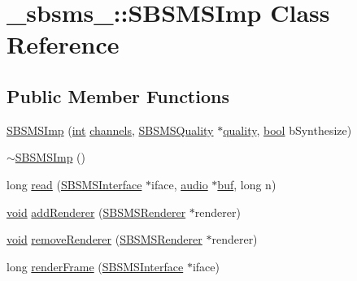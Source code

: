 \hypertarget{class__sbsms___1_1_s_b_s_m_s_imp}{}\section{\+\_\+sbsms\+\_\+\+:\+:S\+B\+S\+M\+S\+Imp Class Reference}
\label{class__sbsms___1_1_s_b_s_m_s_imp}
\subsection*{Public Member Functions}
\begin{DoxyCompactItemize}
\item 
\hyperlink{class__sbsms___1_1_s_b_s_m_s_imp_aae19cb82d09b4891efd2502de71b8eba}{S\+B\+S\+M\+S\+Imp} (\hyperlink{xmltok_8h_a5a0d4a5641ce434f1d23533f2b2e6653}{int} \hyperlink{class__sbsms___1_1_s_b_s_m_s_imp_abd260927c70ac1e41c4b37b3445eae69}{channels}, \hyperlink{class__sbsms___1_1_s_b_s_m_s_quality}{S\+B\+S\+M\+S\+Quality} $\ast$\hyperlink{class__sbsms___1_1_s_b_s_m_s_imp_ad1b294ed77e52813409d048751af118c}{quality}, \hyperlink{mac_2config_2i386_2lib-src_2libsoxr_2soxr-config_8h_abb452686968e48b67397da5f97445f5b}{bool} b\+Synthesize)
\item 
\hyperlink{class__sbsms___1_1_s_b_s_m_s_imp_a76d6ef5a5db4686c10cffa55989deffe}{$\sim$\+S\+B\+S\+M\+S\+Imp} ()
\item 
long \hyperlink{class__sbsms___1_1_s_b_s_m_s_imp_ad7942364e8753c9a93e186d36d7edec8}{read} (\hyperlink{class__sbsms___1_1_s_b_s_m_s_interface}{S\+B\+S\+M\+S\+Interface} $\ast$iface, \hyperlink{namespace__sbsms___a11786cc5bd221ff534972ae350477324}{audio} $\ast$\hyperlink{xlstr_8c_a781718f5b53a876fe91c424c4607fa8f}{buf}, long n)
\item 
\hyperlink{sound_8c_ae35f5844602719cf66324f4de2a658b3}{void} \hyperlink{class__sbsms___1_1_s_b_s_m_s_imp_ae51750c57f8d8d97120c20d6676ab86e}{add\+Renderer} (\hyperlink{class__sbsms___1_1_s_b_s_m_s_renderer}{S\+B\+S\+M\+S\+Renderer} $\ast$renderer)
\item 
\hyperlink{sound_8c_ae35f5844602719cf66324f4de2a658b3}{void} \hyperlink{class__sbsms___1_1_s_b_s_m_s_imp_a024d19ff724a7207c8ae2118eda38516}{remove\+Renderer} (\hyperlink{class__sbsms___1_1_s_b_s_m_s_renderer}{S\+B\+S\+M\+S\+Renderer} $\ast$renderer)
\item 
long \hyperlink{class__sbsms___1_1_s_b_s_m_s_imp_abc4b12e5e4e86fd134ea4dd13f85629a}{render\+Frame} (\hyperlink{class__sbsms___1_1_s_b_s_m_s_interface}{S\+B\+S\+M\+S\+Interface} $\ast$iface)
\end{DoxyCompactItemize}
